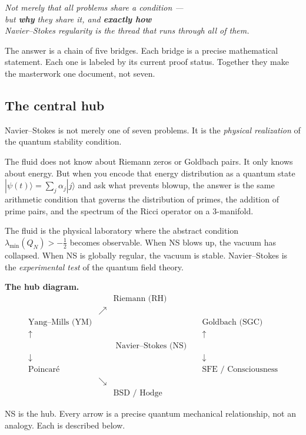 \documentclass[12pt]{article}
\newcommand{\ket}[1]{|{#1}\rangle}
\newcommand{\half}{\tfrac{1}{2}}
\begin{document}
\begin{center}
\textit{Not merely that all problems share a condition ---\\
but \textbf{why} they share it, and \textbf{exactly how}\\
Navier--Stokes regularity is the thread that runs through all of them.}
\end{center}

The answer is a chain of five bridges.
Each bridge is a precise mathematical statement.
Each one is labeled by its current proof status.
Together they make the masterwork one document, not seven.

\subsection{The central hub}

Navier--Stokes is not merely one of seven problems.
It is the \emph{physical realization} of the quantum stability condition.

The fluid does not know about Riemann zeros or Goldbach pairs.
It only knows about energy.
But when you encode that energy distribution as a quantum state
$\ket{\psi(t)} = \sum_j\alpha_j\ket{j}$
and ask what prevents blowup,
the answer is the same arithmetic condition that governs
the distribution of primes, the addition of prime pairs,
and the spectrum of the Ricci operator on a 3-manifold.

The fluid is the physical laboratory where the abstract condition
$\lambda_{\min}(Q_N) > -\half$ becomes observable.
When NS blows up, the vacuum has collapsed.
When NS is globally regular, the vacuum is stable.
Navier--Stokes is the \emph{experimental test} of the quantum field theory.

\begin{tcolorbox}[qbox]
\textbf{The hub diagram.}
\[
\begin{array}{ccccc}
 & & \text{Riemann (RH)} & & \\
 & \nearrow & & & \\
\text{Yang--Mills (YM)} & & & & \text{Goldbach (SGC)}\\
\uparrow & & & & \uparrow \\
 & & \boxed{\;\text{Navier--Stokes (NS)}\;} & & \\
\downarrow & & & & \downarrow \\
\text{Poincar\'{e}} & & & & \text{SFE / Consciousness}\\
 & \searrow & & & \\
 & & \text{BSD / Hodge} & &
\end{array}
\]

NS is the hub.
Every arrow is a precise quantum mechanical relationship,
not an analogy.
Each is described below.
\end{tcolorbox}
\end{document}
